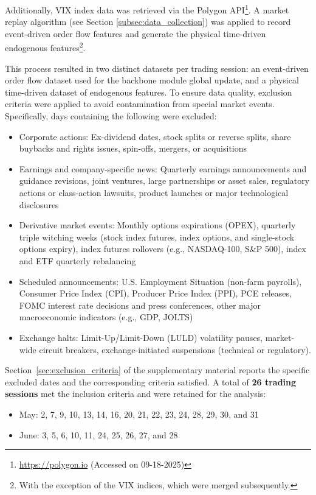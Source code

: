 \documentclass[10pt,a4paper,oneside]{article}
\providecommand{\DIFaddend}{} %
\DeclareRobustCommand{\DIFaddend}{\DIFOaddend \let\includegraphics\DIFOincludegraphics} %
\begin{document}
\DIFaddend Additionally, VIX index data was retrieved via the Polygon API\footnote{\url{https://polygon.io} (Accessed on 09-18-2025)}. A market replay algorithm (see Section \ref{subsec:data_collection}) was applied to record event-driven order flow features and generate the physical time-driven endogenous features\footnote{With the exception of the VIX indices, which were merged subsequently.}.

This process resulted in two distinct datasets per trading session: an event-driven order flow dataset used for the backbone module global update, and a physical time-driven dataset of endogenous features. To ensure data quality, exclusion criteria were applied to avoid contamination from special market events. Specifically, days containing the following were excluded:


\begin{itemize}
    \item Corporate actions: Ex-dividend dates, stock splits or reverse splits, share buybacks and rights issues, spin-offs, mergers, or acquisitions
    \item Earnings and company-specific news: Quarterly earnings announcements and guidance revisions, joint ventures, large partnerships or asset sales, regulatory actions or class-action lawsuits, product launches or major technological disclosures
    \item Derivative market events: Monthly options expirations (OPEX), quarterly triple witching weeks (stock index futures, index options, and single-stock options expiry), index futures rollovers (e.g., NASDAQ-100, S\&P 500), index and ETF quarterly rebalancing
    \item Scheduled announcements: U.S. Employment Situation (non-farm payrolls), Consumer Price Index (CPI), Producer Price Index (PPI), PCE releases, FOMC interest rate decisions and press conferences, other major macroeconomic indicators (e.g., GDP, JOLTS)
    \item Exchange halts: Limit-Up/Limit-Down (LULD) volatility pauses, market-wide circuit breakers, exchange-initiated suspensions (technical or regulatory).
\end{itemize}

Section~\ref{sec:exclusion_criteria} of the supplementary material reports the specific excluded dates and the corresponding criteria satisfied. A total of \textbf{26 trading sessions} met the inclusion criteria and were retained for the analysis:

\begin{itemize}
    \item May: 2, 7, 9, 10, 13, 14, 16, 20, 21, 22, 23, 24, 28, 29, 30, and 31
    \item June: 3, 5, 6, 10, 11, 24, 25, 26, 27, and 28
\end{itemize}
\end{document}
